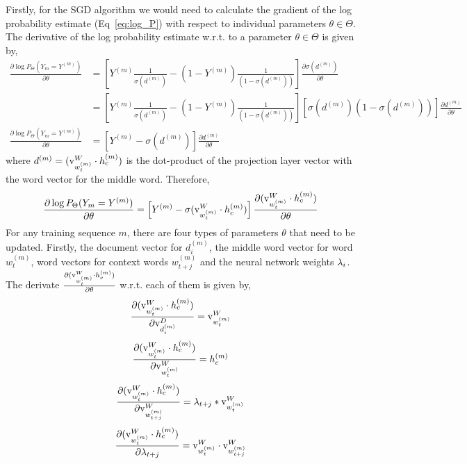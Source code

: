 Firstly, for the SGD algorithm we would need to calculate the gradient of the log probability estimate (Eq~\ref{eq:log_P}) with respect to individual parameters $\theta \in \Theta$. The derivative of the log probability estimate w.r.t. to a parameter $\theta \in \Theta$ is given by,
\begin{align}
\frac{\partial \log P_{\Theta}(Y_{m}=Y^{(m)})} {\partial \theta} &= \left[ Y^{(m)}\frac{1}{\sigma(d^{(m)})} - (1-Y^{(m)})\frac{1}{(1 - \sigma(d^{(m)}))}\right] \frac{\partial \sigma(d^{(m)})}{\partial \theta} \\
&= \left[ Y^{(m)}\frac{1}{ \sigma(d^{(m)})} - (1 - Y^{(m)})\frac{1}{(1 - \sigma(d^{(m)}))}\right] \left[\sigma(d^{(m)})(1-\sigma(d^{(m)}))\right]\frac{\partial d^{(m)}}{\partial \theta} \\
\frac{\partial \log P_{\Theta}(Y_{m}=Y^{(m)})} {\partial \theta} &= \left[ Y^{(m)} - \sigma(d^{(m)})\right] \frac{\partial d^{(m)}}{\partial \theta}
\end{align}
where $d^{(m)} = (\mathrm{v}^{W}_{w^{(m)}_{t}} \cdot h^{(m)}_{c})$ is the dot-product of the projection layer vector with the word vector for the middle word. Therefore,
\begin{equation}
\label{eq:partial_theta}
\frac{\partial \log P_{\Theta}(Y_{m}=Y^{(m)})} {\partial \theta} = \left[ Y^{(m)} - \sigma(\mathrm{v}^{W}_{w^{(m)}_{t}} \cdot h^{(m)}_{c})\right] \frac{\partial (\mathrm{v}^{W}_{w^{(m)}_{t}} \cdot h^{(m)}_{c})}{\partial \theta}
\end{equation}
For any training sequence $m$, there are four types of parameters $\theta$ that need to be updated. Firstly, the document vector for $d^{(m)}_{i}$, the middle word vector for word $w^{(m)}_{t}$, word vectors for context words $w^{(m)}_{t+j}$ and the neural network weights $\lambda_{i}$. The derivate $\frac{\partial (\mathrm{v}^{W}_{w^{(m)}_{t}} \cdot h^{(m)}_{c})}{\partial \theta}$ w.r.t. each of them is given by,
\begin{equation}
\label{eq:partial_doc}
\frac{\partial (\mathrm{v}^{W}_{w^{(m)}_{t}} \cdot h^{(m)}_{c})}{\partial \mathrm{v}^{D}_{d^{(m)}_{i}}} = \mathrm{v}^{W}_{w^{(m)}_{t}}
\end{equation}
\begin{equation}
\label{eq:partial_w_t}
\frac{\partial (\mathrm{v}^{W}_{w^{(m)}_{t}} \cdot h^{(m)}_{c})}{\partial \mathrm{v}^{W}_{w^{(m)}_{t}}} = h^{(m)}_{c}
\end{equation}
\begin{equation}
\label{eq:partial_w_t-k}
\frac{\partial (\mathrm{v}^{W}_{w^{(m)}_{t}} \cdot h^{(m)}_{c})}{\partial \mathrm{v}^{W}_{w^{(m)}_{t+j}}} = \lambda_{t+j}* \mathrm{v}^{W}_{w^{(m)}_{t}}
\end{equation}
\begin{equation}
\label{eq:partial_wgt_t-k}
\frac{\partial (\mathrm{v}^{W}_{w^{(m)}_{t}} \cdot h^{(m)}_{c})}{\partial \lambda_{t+j}} = \mathrm{v}^{W}_{w^{(m)}_{t}} \cdot \mathrm{v}^{W}_{w^{(m)}_{t+j}}
\end{equation}

